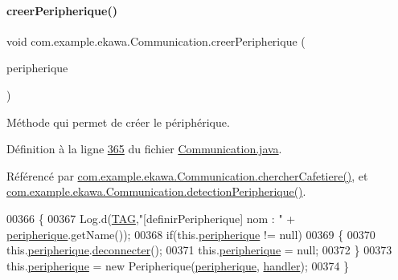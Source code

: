 \paragraph{\texorpdfstring{creer\+Peripherique()}{creerPeripherique()}}
{\footnotesize\ttfamily void com.\+example.\+ekawa.\+Communication.\+creer\+Peripherique (\begin{DoxyParamCaption}\item[{Bluetooth\+Device}]{peripherique }\end{DoxyParamCaption})\hspace{0.3cm}{\ttfamily [private]}}



Méthode qui permet de créer le périphérique. 



Définition à la ligne \hyperlink{_communication_8java_source_l00365}{365} du fichier \hyperlink{_communication_8java_source}{Communication.\+java}.



Référencé par \hyperlink{_communication_8java_source_l00276}{com.\+example.\+ekawa.\+Communication.\+chercher\+Cafetiere()}, et \hyperlink{_communication_8java_source_l00140}{com.\+example.\+ekawa.\+Communication.\+detection\+Peripherique()}.


\begin{DoxyCode}
00366     \{
00367         Log.d(\hyperlink{classcom_1_1example_1_1ekawa_1_1_communication_af355bac38153a4e6d1cda0b3e74bc1c7}{TAG},\textcolor{stringliteral}{"[definirPeripherique] nom : "} + \hyperlink{classcom_1_1example_1_1ekawa_1_1_communication_a59a25b4807148701560e4341f79c0c16}{peripherique}.getName());
00368         \textcolor{keywordflow}{if}(this.\hyperlink{classcom_1_1example_1_1ekawa_1_1_communication_a59a25b4807148701560e4341f79c0c16}{peripherique} != null)
00369         \{
00370             this.\hyperlink{classcom_1_1example_1_1ekawa_1_1_communication_a59a25b4807148701560e4341f79c0c16}{peripherique}.\hyperlink{classcom_1_1example_1_1ekawa_1_1_peripherique_aadfd24f4d783a7834c044041c7c035bb}{deconnecter}();
00371             this.\hyperlink{classcom_1_1example_1_1ekawa_1_1_communication_a59a25b4807148701560e4341f79c0c16}{peripherique} = null;
00372         \}
00373         this.\hyperlink{classcom_1_1example_1_1ekawa_1_1_communication_a59a25b4807148701560e4341f79c0c16}{peripherique} = \textcolor{keyword}{new} Peripherique(\hyperlink{classcom_1_1example_1_1ekawa_1_1_communication_a59a25b4807148701560e4341f79c0c16}{peripherique}, 
      \hyperlink{classcom_1_1example_1_1ekawa_1_1_communication_ae1e1b4415de23491b36f0bd70da2f164}{handler});
00374     \}
\end{DoxyCode}
\mbox{\label{classcom_1_1example_1_1ekawa_1_1_communication_a024ca42abcc8727d303a54ec44b4c99b}} 
